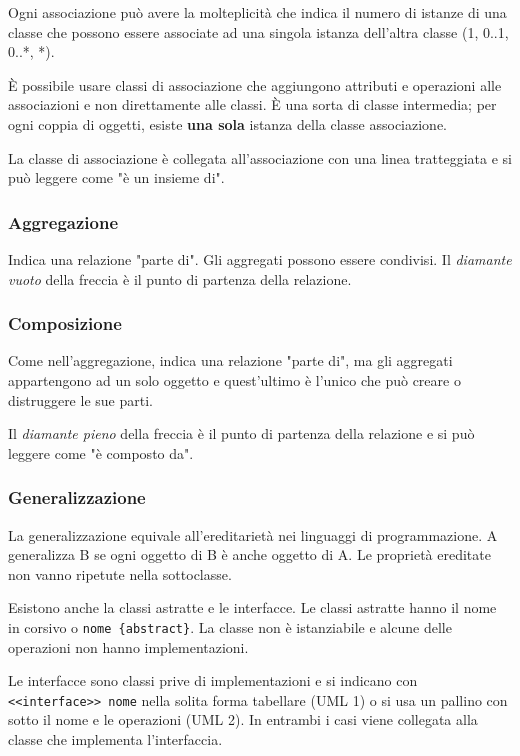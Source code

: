 Ogni associazione può avere la molteplicità che indica il numero di istanze di una classe che possono essere associate ad una singola istanza dell'altra classe (1, 0..1, 0..*, *).

\`E possibile usare classi di associazione che aggiungono attributi e operazioni alle associazioni e non direttamente alle classi. 
\`E una sorta di classe intermedia; per ogni coppia di oggetti, esiste \textbf{una sola} istanza della classe associazione. 

La classe di associazione è collegata all'associazione con una linea tratteggiata e si può leggere come "è un insieme di".

\subsubsection{Aggregazione}
Indica una relazione "parte di". Gli aggregati possono essere condivisi. Il \textit{diamante vuoto} della freccia è il punto di partenza della relazione.

\subsubsection{Composizione}
Come nell'aggregazione, indica una relazione "parte di", ma gli aggregati appartengono ad un solo oggetto e quest'ultimo è l'unico che può creare o distruggere le sue parti. 

Il \textit{diamante pieno} della freccia è il punto di partenza della relazione e si può leggere come "è composto da".

\subsubsection{Generalizzazione}
La generalizzazione equivale all'ereditarietà nei linguaggi di programmazione. 
A generalizza B se ogni oggetto di B è anche oggetto di A. Le proprietà ereditate non vanno ripetute nella sottoclasse.

Esistono anche la classi astratte e le interfacce. Le classi astratte hanno il nome in corsivo o \texttt{nome \{abstract\}}. La classe non è istanziabile  e alcune delle operazioni non hanno implementazioni. 

Le interfacce sono classi prive di implementazioni e si indicano con \texttt{<<interface>> nome} nella solita forma tabellare (UML 1) o si usa un pallino con sotto il nome e le operazioni (UML 2). 
In entrambi i casi viene collegata alla classe che implementa l'interfaccia.

